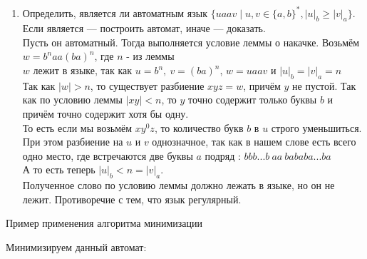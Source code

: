 \documentclass[12pt]{article}
\begin{document}
\begin{enumerate}
  \item Определить, является ли автоматным язык $\{ u a a v \mid u, v \in \{ a, b \}^* , |u|_b \geq |v|_a \}$. Если является --- построить автомат, иначе --- доказать.
  \\
  Пусть он автоматный. Тогда выполняется условие леммы о накачке. Возьмём $w = b^n a a (b a) ^ n$, где $n$ - из леммы \\
  $w$ лежит в языке, так как $u = b^n , \ v = (ba)^n$, $w = uaav$ и $|u|_b = |v|_a = n$  \\
Так как $|w| > n$, то существует разбиение $xyz = w$, причём $y$ не пустой. Так как по условию леммы $|xy| < n$, то $y$ точно содержит только буквы $b$ и причём точно содержит хотя бы одну. \\
То есть если мы возьмём $xy^0z$, то количество букв $b$ в $u$ строго уменьшиться. При этом разбиение на $u$ и $v$ однозначное, так как в нашем слове есть всего одно место, где встречаются две буквы $a$ подряд : $bbb...b \ aa \ bababa...ba$ \\
А то есть теперь $|u|_b < n = |v|_a$. \\
Полученное слово по условию леммы должно лежать в языке, но он не лежит. Противоречие с тем, что язык регулярный.
  \\
\end{enumerate}

\newpage

\begin{center}
  \Large{Пример применения алгоритма минимизации}
\end{center}

\bigskip

Минимизируем данный автомат:
\end{document}
